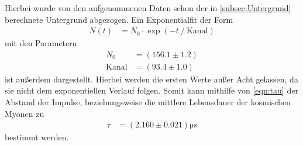 Hierbei wurde von den aufgenommenen Daten schon der in \autoref{subsec:Untergrund} berechnete Untergrund abgezogen.
Ein Exponentialfit der Form
\begin{align*}
  N(t) &= N_0 \cdot \exp(-t \mathbin{/} \text{Kanal})
\end{align*}
mit den Parametern 
\begin{align*}
  N_0 &= (156.1 \pm 1.2)\\
  \text{Kanal} &= (93.4 \pm 1.0)
\end{align*}
ist außerdem dargestellt.
Hierbei werden die ersten Werte außer Acht gelassen, da sie nicht dem exponentiellen Verlauf folgen.
Somit kann mithilfe von \autoref{eqn:tau} der Abstand der Impulse, beziehungsweise die mittlere Lebensdauer der kosmischen Myonen
zu 
\begin{align*}
  \tau &= (2.160 \pm 0.021)\si{\micro\second}
\end{align*}
bestimmt werden.

